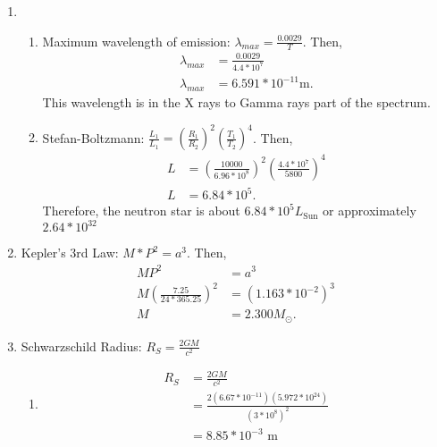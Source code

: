 \documentclass{article}
\begin{document}
\begin{enumerate}
    \item
    
    \begin{enumerate}
        \item 
        
        Maximum wavelength of emission: $\lambda_{max} = \frac{0.0029}{T}$. Then,
        \begin{align*}
            \lambda_{max} &= \frac{0.0029}{4.4*10^7}\\
            \lambda_{max} &= 6.591*10^{-11}\text{m}.
        \end{align*} This wavelength is in the X rays to Gamma rays part of the spectrum.
        
        \item
        
        Stefan-Boltzmann: $\frac{L_1}{L_1} = (\frac{R_1}{R_2})^2(\frac{T_1}{T_2})^4$. Then,
        \begin{align*}
            L &= (\frac{10000}{6.96*10^8})^2(\frac{4.4*10^7}{5800})^4\\
            L &= 6.84*10^5.
        \end{align*} Therefore, the neutron star is about $6.84*10^5 L_\text{Sun}$ or approximately $2.64*10^{32}$
        
    \end{enumerate}
    
    \item
    
    Kepler's 3rd Law: $M*P^2=a^3$. Then,
    \begin{align*}
        MP^2 &= a^3\\
        M (\frac{7.25}{24*365.25})^2 &= (1.163*10^{-2})^3\\
        M &= 2.300 M_\odot.
    \end{align*}
    
    \item
    
    Schwarzschild Radius: $R_S = \frac{2GM}{c^2}$
    \begin{enumerate}
        \item 
        
        \begin{align*}
            R_S &= \frac{2GM}{c^2}\\
            &= \frac{2(6.67*10^{-11})(5.972*10^{24})}{(3*10^8)^2}\\
            &= 8.85*10^{-3}\text{ m}
        \end{align*}
        

\end{enumerate}
\end{enumerate}
\end{document}
